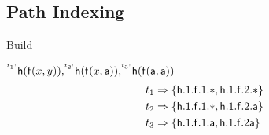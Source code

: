 \subsection{Path Indexing}


\begin{example}{Build}
	\def\TRIEWIDTH{4cm}
	\def\TEXTWIDTH{\textwidth-\TRIEWIDTH-2em}
	
	\begin{minipage}{\TEXTWIDTH}
		$
		\TI{t_1}\,\mh(\mf(x,y)),
		\TI{t_2}\mh(\mf( x,\ma)),
		\TI{t_3}\mh(\mf(\ma,\ma))
		$
		\begin{align*}
		t_1 &\Rightarrow \{ \mh.1.\mf.1.{*},  \mh.1.\mf.2.{*} \}\\
		t_2 &\Rightarrow \{ \mh.1.\mf.1.{*},  \mh.1.\mf.2.\ma \}\\
		t_3 &\Rightarrow \{ \mh.1.\mf.1.\ma,  \mh.1.\mf.2 \ma \}
		\end{align*}
	\end{minipage}	
%
	\begin{minipage}{\TRIEWIDTH}		
	\begin{tikzpicture}[->,dotted]
%		


		\end{tikzpicture}
	\end{minipage}
\end{example}


